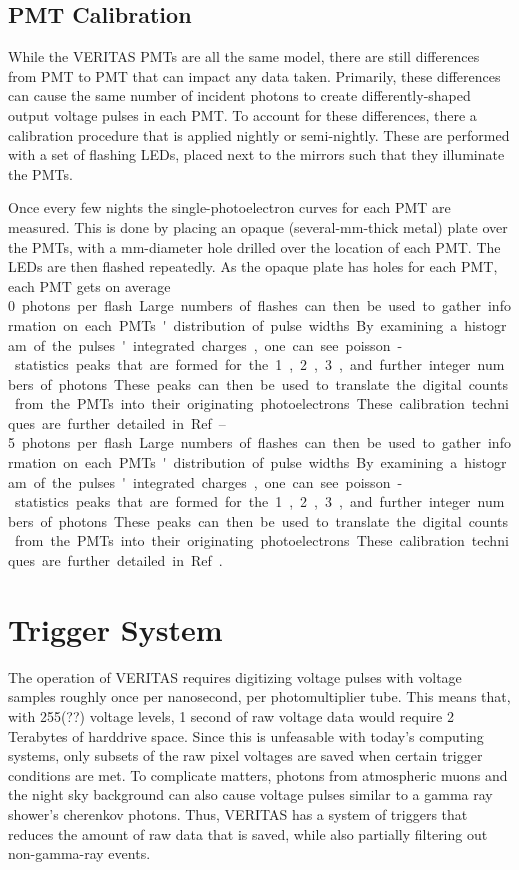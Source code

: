 \subsection{PMT Calibration}

While the VERITAS PMTs are all the same model, there are still differences from PMT to PMT that can impact any data taken.
Primarily, these differences can cause the same number of incident photons to create differently-shaped output voltage pulses in each PMT.
To account for these differences, there a calibration procedure that is applied nightly or semi-nightly.
These are performed with a set of flashing LEDs, placed next to the mirrors such that they illuminate the PMTs.

Once every few nights the single-photoelectron curves for each PMT are measured.
This is done by placing an opaque (several-mm-thick metal) plate over the PMTs, with a mm-diameter hole drilled over the location of each PMT.
The LEDs are then flashed repeatedly.
As the opaque plate has holes for each PMT, each PMT gets on average \SIrange{0}{5} photons per flash.
Large numbers of flashes can then be used to gather information on each PMTs' distribution of pulse widths.
By examining a histogram of the pulses' integrated charges, one can see poisson-statistics peaks that are formed for the 1, 2, 3, and further integer numbers of photons.
These peaks can then be used to translate the digital counts from the PMTs into their originating photoelectrons.
These calibration techniques are further detailed in Ref.~\cite{calib_techniques}.


\section{Trigger System}\label{sec:trig}

The operation of VERITAS requires digitizing voltage pulses with voltage samples roughly once per nanosecond, per photomultiplier tube.
This means that, with 255{\color{red}(??)} voltage levels, 1 second of raw voltage data would require 2 Terabytes of harddrive space.
Since this is unfeasable with today's computing systems, only subsets of the raw pixel voltages are saved when certain trigger conditions are met.
To complicate matters, photons from atmospheric muons and the night sky background can also cause voltage pulses similar to a gamma ray shower's cherenkov photons.
Thus, VERITAS has a system of triggers that reduces the amount of raw data that is saved, while also partially filtering out non-gamma-ray events.

